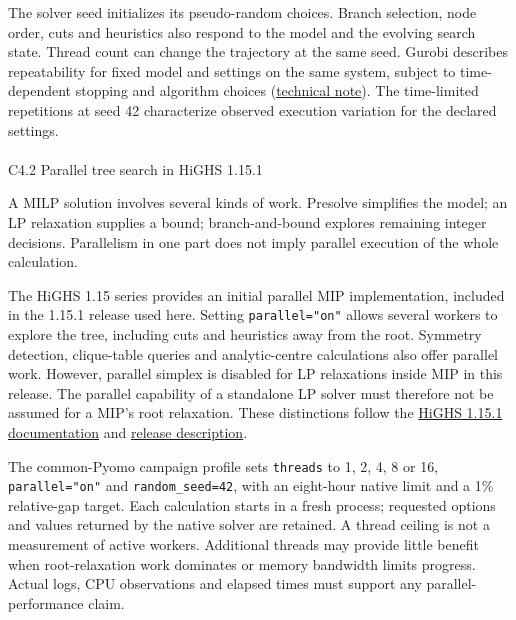 \documentclass[
  english,
  11pt,
  a4paper,
]{article}
\makeatletter
\let\oldparagraph\paragraph
\renewcommand{\paragraph}{
    \@ifstar
      \xxxParagraphStar
      \xxxParagraphNoStar
  }
\newcommand{\xxxParagraphStar}[1]{\oldparagraph*{#1}\mbox{}}
\newcommand{\xxxParagraphNoStar}[1]{\oldparagraph{#1}\mbox{}}
\makeatother
\begin{document}
The solver seed initializes its pseudo-random choices. Branch selection,
node order, cuts and heuristics also respond to the model and the
evolving search state. Thread count can change the trajectory at the
same seed. Gurobi describes repeatability for fixed model and settings
on the same system, subject to time-dependent stopping and algorithm
choices
(\href{https://support.gurobi.com/hc/en-us/articles/360031636051-Is-Gurobi-deterministic}{technical
note}). The time-limited repetitions at seed 42 characterize observed
execution variation for the declared settings.

\paragraph{C4.2 Parallel tree search in HiGHS
1.15.1}\label{parallel-tree-search-in-highs-1.15.1}

A MILP solution involves several kinds of work. Presolve simplifies the
model; an LP relaxation supplies a bound; branch-and-bound explores
remaining integer decisions. Parallelism in one part does not imply
parallel execution of the whole calculation.

The HiGHS 1.15 series provides an initial parallel MIP implementation,
included in the 1.15.1 release used here. Setting \texttt{parallel="on"}
allows several workers to explore the tree, including cuts and
heuristics away from the root. Symmetry detection, clique-table queries
and analytic-centre calculations also offer parallel work. However,
parallel simplex is disabled for LP relaxations inside MIP in this
release. The parallel capability of a standalone LP solver must
therefore not be assumed for a MIP's root relaxation. These distinctions
follow the
\href{https://github.com/ERGO-Code/HiGHS/blob/v1.15.1/docs/src/parallel.md}{HiGHS
1.15.1 documentation} and
\href{https://github.com/ERGO-Code/HiGHS/releases/tag/v1.15.1}{release
description}.

The common-Pyomo campaign profile sets \texttt{threads} to 1, 2, 4, 8 or
16, \texttt{parallel="on"} and \texttt{random\_seed=42}, with an
eight-hour native limit and a 1\% relative-gap target. Each calculation
starts in a fresh process; requested options and values returned by the
native solver are retained. A thread ceiling is not a measurement of
active workers. Additional threads may provide little benefit when
root-relaxation work dominates or memory bandwidth limits progress.
Actual logs, CPU observations and elapsed times must support any
parallel-performance claim.
\end{document}
